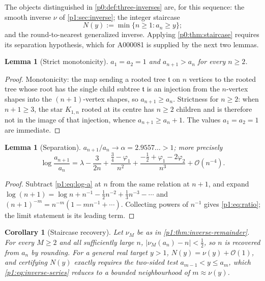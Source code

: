 \documentclass[11pt,a4paper,oneside]{book}
\theoremstyle{plain}
\newtheorem{lemma}[theorem]{Lemma}
\newtheorem{corollary}[theorem]{Corollary}
\theoremstyle{definition}
\theoremstyle{remark}
\newcommand{\bigO}{\mathcal{O}}
\begin{document}
The objects distinguished in \cref{p0:def:three-inverses} are, for this sequence: the smooth
inverse $\nu$ of \cref{p1:sec:inverse}; the integer staircase
\begin{equation}
 N(y):=\min\{n\ge1: a_n\ge y\};
 \label{p1:eq:staircase}
\end{equation}
and the round-to-nearest generalized inverse.  Applying \cref{p0:thm:staircase} requires its
separation hypothesis, which for A000081 is supplied by the next two lemmas.

\begin{lemma}[Strict monotonicity]
\label{p1:lem:monotone}
$a_1=a_2=1$ and $a_{n+1}>a_n$ for every $n\ge2$.
\end{lemma}

\begin{proof}
Monotonicity: the map sending a rooted tree $\mathfrak t$ on $n$ vertices to the rooted tree
whose root has the single child subtree $\mathfrak t$ is an injection from the $n$-vertex
shapes into the $(n+1)$-vertex shapes, so $a_{n+1}\ge a_n$.  Strictness for $n\ge2$: when
$n+1\ge3$, the star $K_{1,n}$ rooted at its centre has $n\ge2$ children and is therefore not
in the image of that injection, whence $a_{n+1}\ge a_n+1$.  The values $a_1=a_2=1$ are
immediate.
\end{proof}

\begin{lemma}[Separation]
\label{p1:lem:separation}
$a_{n+1}/a_n\to\alpha=2.9557\ldots>1$; more precisely
\begin{equation}
 \log\frac{a_{n+1}}{a_n}
 =\lambda-\frac{3}{2n}+\frac{\tfrac34-\varphi_1}{n^{2}}
 +\frac{-\tfrac12+\varphi_1-2\varphi_2}{n^{3}}+\bigO(n^{-4}).
 \label{p1:eq:ratio}
\end{equation}
\end{lemma}

\begin{proof}
Subtract \cref{p1:eq:log-a} at $n$ from the same relation at $n+1$, and expand $\log(n+1)=\log
n+n^{-1}-\tfrac12n^{-2}+\tfrac13n^{-3}-\cdots$ and $(n+1)^{-m}=n^{-m}(1-mn^{-1}+\cdots)$.
Collecting powers of $n^{-1}$ gives \cref{p1:eq:ratio}; the limit statement is its leading
term.
\end{proof}

\begin{corollary}[Staircase recovery]
\label{p1:cor:staircase}
Let $\nu_M$ be as in \cref{p1:thm:inverse-remainder}.  For every $M\ge2$ and all sufficiently
large $n$, $\bigl|\nu_M(a_n)-n\bigr|<\tfrac12$, so $n$ is recovered from $a_n$ by rounding.
For a general real target $y>1$, $N(y)=\nu(y)+\bigO(1)$, and certifying $N(y)$ exactly
requires the two-sided test $a_{m-1}<y\le a_m$, which \cref{p1:eq:inverse-series} reduces to a
bounded neighbourhood of $m\approx\nu(y)$.
\end{corollary}
\end{document}
